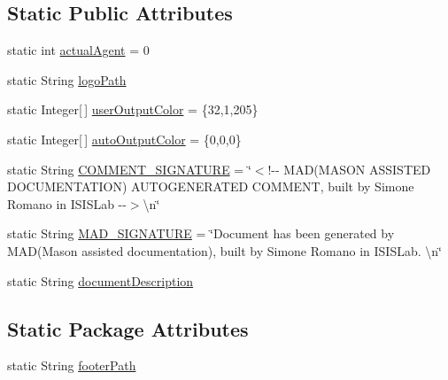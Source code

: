 \subsection*{Static Public Attributes}
\begin{DoxyCompactItemize}
\item 
static int \hyperlink{classit_1_1isislab_1_1masonassisteddocumentation_1_1mason_1_1analizer_1_1_global_utility_ad969120645ce5135ca95177f6bb5ce42}{actual\-Agent} = 0
\item 
static String \hyperlink{classit_1_1isislab_1_1masonassisteddocumentation_1_1mason_1_1analizer_1_1_global_utility_aeb806bda4a3b7b9099e2197bdca5cd75}{logo\-Path}
\item 
static Integer\mbox{[}$\,$\mbox{]} \hyperlink{classit_1_1isislab_1_1masonassisteddocumentation_1_1mason_1_1analizer_1_1_global_utility_a0fcb324ae33eb93bd5b9177e342ecc82}{user\-Output\-Color} = \{32,1,205\}
\item 
static Integer\mbox{[}$\,$\mbox{]} \hyperlink{classit_1_1isislab_1_1masonassisteddocumentation_1_1mason_1_1analizer_1_1_global_utility_a2e086c8a2d8edf16b2eaf90408832adc}{auto\-Output\-Color} = \{0,0,0\}
\item 
static String \hyperlink{classit_1_1isislab_1_1masonassisteddocumentation_1_1mason_1_1analizer_1_1_global_utility_a9191677742da30af21771374343da817}{C\-O\-M\-M\-E\-N\-T\-\_\-\-S\-I\-G\-N\-A\-T\-U\-R\-E} = \char`\"{}$<$!-\/-\/ M\-A\-D(M\-A\-S\-O\-N A\-S\-S\-I\-S\-T\-E\-D D\-O\-C\-U\-M\-E\-N\-T\-A\-T\-I\-O\-N) A\-U\-T\-O\-G\-E\-N\-E\-R\-A\-T\-E\-D C\-O\-M\-M\-E\-N\-T, built by Simone Romano in I\-S\-I\-S\-Lab -\/-\/$>$\textbackslash{}n\char`\"{}
\item 
static String \hyperlink{classit_1_1isislab_1_1masonassisteddocumentation_1_1mason_1_1analizer_1_1_global_utility_ad6c866fb747d2689e54290c69ebfe1ce}{M\-A\-D\-\_\-\-S\-I\-G\-N\-A\-T\-U\-R\-E} = \char`\"{}Document has been generated by M\-A\-D(Mason assisted documentation), built by Simone Romano in I\-S\-I\-S\-Lab. \textbackslash{}n\char`\"{}
\item 
static String \hyperlink{classit_1_1isislab_1_1masonassisteddocumentation_1_1mason_1_1analizer_1_1_global_utility_a12aa6c69e16a38c619b275bbea730a4d}{document\-Description}
\end{DoxyCompactItemize}
\subsection*{Static Package Attributes}
\begin{DoxyCompactItemize}
\item 
static String \hyperlink{classit_1_1isislab_1_1masonassisteddocumentation_1_1mason_1_1analizer_1_1_global_utility_ae94176856fb4ef24dfaa70423f5fc3f9}{footer\-Path}
\end{DoxyCompactItemize}

